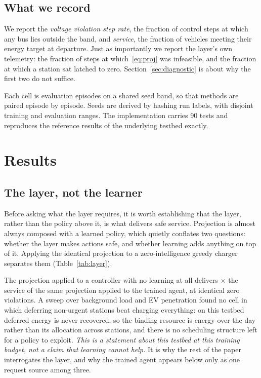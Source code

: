 \documentclass[conference,a4paper]{IEEEtran}
\begin{document}
\subsection{What we record}

We report the \emph{voltage violation step rate}, the fraction of control steps
at which any bus lies outside the band, and \emph{service}, the fraction of
vehicles meeting their energy target at departure. Just as importantly we report
the layer's own telemetry: the fraction of steps at which~\eqref{eq:proj} was
infeasible, and the fraction at which a station sat latched to zero.
Section~\ref{sec:diagnostic} is about why the first two do not suffice.

Each cell is \nEpisodes{} evaluation episodes on a shared seed band, so that
methods are paired episode by episode. Seeds are derived by hashing run labels,
with disjoint training and evaluation ranges. The implementation carries 90 tests
and reproduces the reference results of the underlying testbed exactly.

\section{Results}

\subsection{The layer, not the learner}
\label{sec:layer}

Before asking what the layer requires, it is worth establishing that the layer,
rather than the policy above it, is what delivers safe service. Projection is
almost always composed with a learned policy, which quietly conflates two
questions: whether the layer makes actions safe, and whether learning adds
anything on top of it. Applying the identical projection to a zero-intelligence
greedy charger separates them (Table~\ref{tab:layer}).

\begin{table}[!t]
\caption{The Same Projection, Different Controllers (MV Feeder)}
\label{tab:layer}
\centering\small\setlength{\tabcolsep}{3.5pt}

\end{table}

The projection applied to a controller with no learning at all delivers
\nServiceRatio$\times$ the service of the same projection applied to the trained
agent, at identical zero violations. A sweep over background load and EV
penetration found no cell in which deferring non-urgent stations beat charging
everything: on this testbed deferred energy is never recovered, so the binding
resource is energy over the day rather than its allocation across stations, and
there is no scheduling structure left for a policy to exploit. \emph{This is a
statement about this testbed at this training budget, not a claim that learning
cannot help.} It is why the rest of the paper interrogates the layer, and why the
trained agent appears below only as one request source among three.
\end{document}
